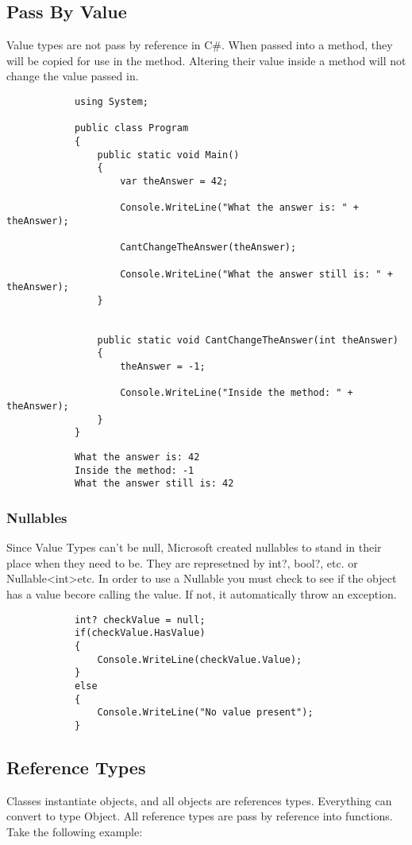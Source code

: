 \documentclass {amsart}
\begin{document}
		\subsection{Pass By Value}  Value types are not pass by reference in C\#. When passed into a method, they will be copied for use in the method.  Altering their value inside a method will not change the value passed in.

		\begin{lstlisting}
			using System;
								
			public class Program
			{
				public static void Main()
				{
					var theAnswer = 42;

					Console.WriteLine("What the answer is: " + theAnswer);
					
					CantChangeTheAnswer(theAnswer);
					
					Console.WriteLine("What the answer still is: " + theAnswer);
				}
				
				
				public static void CantChangeTheAnswer(int theAnswer)
				{
					theAnswer = -1;
					
					Console.WriteLine("Inside the method: " + theAnswer);
				}
			}
		\end{lstlisting}  

		\begin{verbatim}
			What the answer is: 42
			Inside the method: -1
			What the answer still is: 42
		\end{verbatim}

		\subsubsection{Nullables} Since Value Types can't be null, Microsoft created nullables to stand in their place when they need to be.  They are represetned by int?, bool?, etc. or Nullable\textless int\textgreater \space etc.  In order to use a Nullable you must check to see if the object has a value becore calling the value.  If not, it automatically throw an exception.

		\begin{lstlisting}
			int? checkValue = null;
			if(checkValue.HasValue)
			{
				Console.WriteLine(checkValue.Value);
			}
			else
			{
				Console.WriteLine("No value present");
			}
		\end{lstlisting}

	\subsection{Reference Types}  Classes instantiate objects, and all objects are references types.  Everything can convert to type Object.  All reference types are pass by reference into functions.  Take the following example: 
\end{document}
